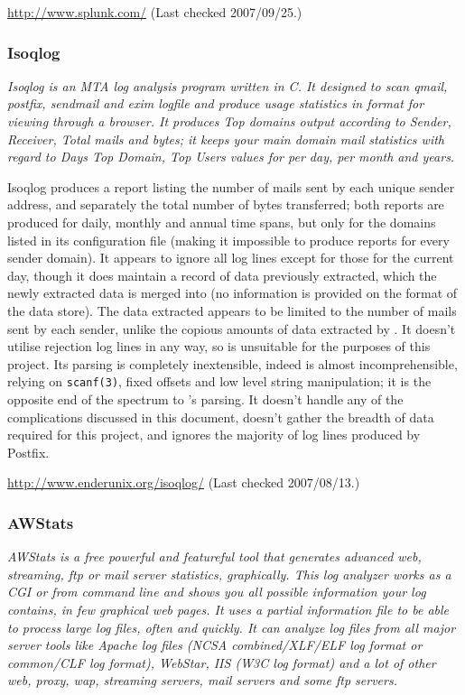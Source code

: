 \documentclass[a4paper,12pt,draft]{article}
\newcommand{\parsername}{\PLP{}}
\newcommand{\parsernames}{\PLP{}'s}
\begin{document}
\url{http://www.splunk.com/} \newline (Last checked 2007/09/25.)

\subsubsection{Isoqlog}

\textit{Isoqlog is an MTA log analysis program written in C. It designed to
scan qmail, postfix, sendmail and exim logfile and produce usage statistics
in \HTML{} format for viewing through a browser. It produces Top domains
output according to Sender, Receiver, Total mails and bytes; it keeps your
main domain mail statistics with regard to Days Top Domain, Top Users
values for per day, per month and years.\/}

Isoqlog produces a report listing the number of mails sent by each unique
sender address, and separately the total number of bytes transferred; both
reports are produced for daily, monthly and annual time spans, but only for
the domains listed in its configuration file (making it impossible to
produce reports for every sender domain).  It appears to ignore all log
lines except for those for the current day, though it does maintain a
record of data previously extracted, which the newly extracted data is
merged into (no information is provided on the format of the data store).
The data extracted appears to be limited to the number of mails sent by
each sender, unlike the copious amounts of data extracted by \parsername{}.
It doesn't utilise rejection log lines in any way, so is unsuitable for the
purposes of this project.  Its parsing is completely inextensible, indeed
is almost incomprehensible, relying on \texttt{scanf(3)}, fixed offsets and
low level string manipulation; it is the opposite end of the spectrum to
\parsernames{} parsing.  It doesn't handle any of the complications
discussed in this document, doesn't gather the breadth of data required for
this project, and ignores the majority of log lines produced by Postfix.

\url{http://www.enderunix.org/isoqlog/} \newline (Last checked 2007/08/13.)

\subsubsection{AWStats}

\textit{AWStats is a free powerful and featureful tool that generates
advanced web, streaming, ftp or mail server statistics, graphically. This
log analyzer works as a CGI or from command line and shows you all possible
information your log contains, in few graphical web pages. It uses a
partial information file to be able to process large log files, often and
quickly. It can analyze log files from all major server tools like Apache
log files (NCSA combined/XLF/ELF log format or common/CLF log format),
WebStar, IIS (W3C log format) and a lot of other web, proxy, wap, streaming
servers, mail servers and some ftp servers.\/}
\end{document}
